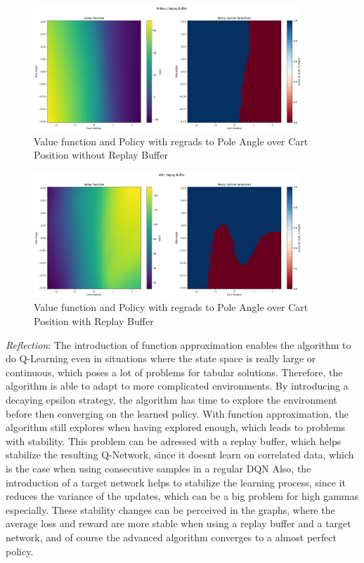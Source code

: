 \documentclass{article} %
\begin{document}
	
	\begin{figure}[h!]
		\centering
		\includegraphics[width=0.9\textwidth]{images/1b_2.png}
		\caption{Value function and Policy with regrads to Pole Angle over Cart Position without Replay Buffer}
		\label{fig:4}
	\end{figure}
	
	
	\begin{figure}[h!]
		\centering
		\includegraphics[width=0.9\textwidth]{images/1b_3.png}
		\caption{Value function and Policy with regrads to Pole Angle over Cart Position with Replay Buffer}
		\label{fig:5}
	\end{figure}
	\newpage
	
	\textit{Reflection}: 
	The introduction of function approximation enables the algorithm to do Q-Learning even in situations where the state space is really large or continuous, which poses a lot of problems for tabular solutions. Therefore, the algorithm is able to adapt to more complicated environments. 
	By introducing a decaying epsilon strategy, the algorithm has time to explore the environment before then converging on the learned policy. With function approximation, the algorithm still explores when having explored enough, which leads to problems with stability. 
	This problem can be adressed with a replay buffer, which helps stabilize the resulting Q-Network, since it doesnt learn on correlated data, which is the case when using consecutive samples in a regular DQN
	Also, the introduction of a target network helps to stabilize the learning process, since it reduces the variance of the updates, which can be a big problem for high gammas especially.
	These stability changes can be perceived in the graphs, where the average loss and reward are more stable when using a replay buffer and a target network, and of course the advanced algorithm converges to a almost perfect policy. 
	
	
	
\end{document}
